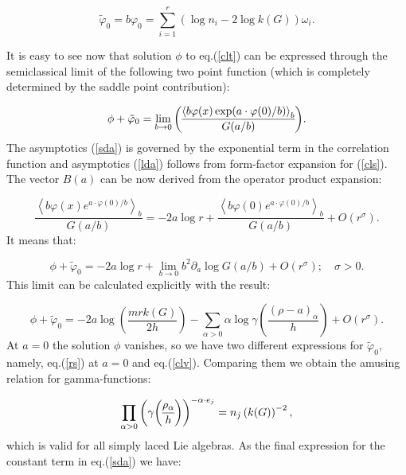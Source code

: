 \documentclass[a4paper,12pt]{article}
\begin{document}
\begin{equation}
\tilde{\varphi}_0=b\varphi _0=\sum_{i=1}^r(\log n_i-2\log k(G))\omega _i
\label{clv}.
\end{equation}

It is easy to see now that solution $\phi $ to eq.(\ref{clt}) 
can be expressed through the
semiclassical limit of the following two point function (which is completely 
determined by the saddle point contribution):

\begin{equation}
\phi +\tilde{\varphi}_0=\lim_{b\rightarrow 0} 
{\left\langle b\varphi (x)\exp (a\cdot \varphi (0)/b)\right\rangle _b \overwithdelims() G(a/b)}.
\label{cls}
\end{equation}
The asymptotics (\ref{sda}) is governed by the exponential term in the
correlation function and asymptotics (\ref{lda}) follows from form-factor
expansion for (\ref{cls}). The vector $B(a)$ can be now derived from the
operator product expansion:

\begin{equation}
\frac{\left\langle b\varphi (x)e^{a\cdot \varphi (0)/b}\right\rangle _b}
{G(a/b)}=-2a\log r+\frac{\left\langle b\varphi (0)e^{a\cdot \varphi
(0)/b}\right\rangle _b}{G(a/b)}+O(r^\sigma ).  \label{ope}
\end{equation}
It means that:

\begin{equation}
\phi +\tilde{\varphi}_0=-2a\log r+\lim_{b\rightarrow 0}b^2\partial _a\log
G(a/b)+O(r^\sigma );\quad \sigma >0.  \label{bb}
\end{equation}
This limit can be calculated explicitly with the result:

\begin{equation}
\phi +\tilde{\varphi}_0=-2a\log \left( \frac{mrk(G)}{2h}\right)
-\sum_{\alpha >0}\alpha \log \gamma \left( \frac{(\rho -a)_\alpha }h\right)
+O(r^\sigma ).  \label{rs}
\end{equation}
At $a=0$ the solution $\phi $ vanishes, so we have two different expressions
for $\tilde{\varphi}_0,$ namely, eq.(\ref{rs}) at $a=0$ and eq.(\ref{clv}).
Comparing them we obtain the amusing relation for gamma-functions:

\begin{equation}
\prod_{\alpha >0}\left( \gamma 
{\rho _\alpha  \overwithdelims() h}
\right) ^{-\alpha \cdot e_j}=n_j\left( k(G)\right) ^{-2},  \label{gfr}
\end{equation}
which is valid for all simply laced Lie algebras. As the final expression
for the constant term in eq.(\ref{sda}) we have:
\end{document}
